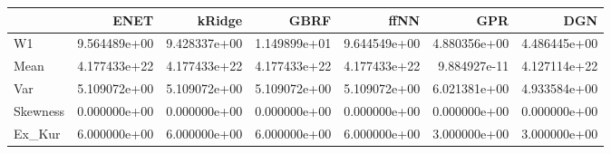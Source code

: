 \begin{tabular}{lrrrrrr}
\toprule
{} &          ENET &        kRidge &          GBRF &          ffNN &           GPR &           DGN \\
\midrule
W1       &  9.564489e+00 &  9.428337e+00 &  1.149899e+01 &  9.644549e+00 &  4.880356e+00 &  4.486445e+00 \\
Mean     &  4.177433e+22 &  4.177433e+22 &  4.177433e+22 &  4.177433e+22 &  9.884927e-11 &  4.127114e+22 \\
Var      &  5.109072e+00 &  5.109072e+00 &  5.109072e+00 &  5.109072e+00 &  6.021381e+00 &  4.933584e+00 \\
Skewness &  0.000000e+00 &  0.000000e+00 &  0.000000e+00 &  0.000000e+00 &  0.000000e+00 &  0.000000e+00 \\
Ex\_Kur   &  6.000000e+00 &  6.000000e+00 &  6.000000e+00 &  6.000000e+00 &  3.000000e+00 &  3.000000e+00 \\
\bottomrule
\end{tabular}
